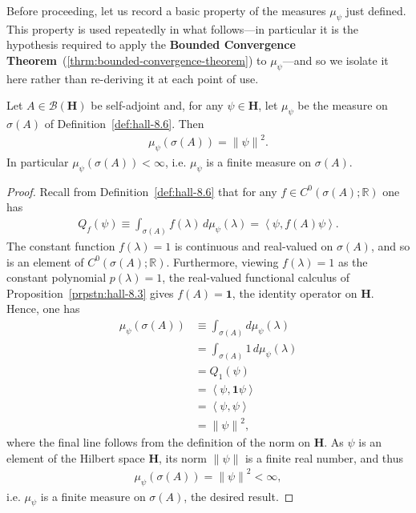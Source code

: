 Before proceeding, let us record a basic property of the measures $\mu_\psi$ just defined. This property is used repeatedly in what follows---in particular it is the hypothesis required to apply the \textbf{Bounded Convergence Theorem}~(\ref{thrm:bounded-convergence-theorem}) to $\mu_\psi$---and so we isolate it here rather than re-deriving it at each point of use.

\begin{lemma}
    \label{lmm:associated-measures-are-finite}
    \leanok
    Let $A \in \mathcal{B}(\mathbf{H})$ be self-adjoint and, for any $\psi \in \mathbf{H}$, let $\mu_\psi$ be the measure on $\sigma(A)$ of Definition~\ref{def:hall-8.6}. Then
    \begin{align}
        \mu_\psi(\sigma(A)) = \left\| \psi \right\|^2.
    \end{align}
    In particular $\mu_\psi(\sigma(A)) < \infty$, i.e. $\mu_\psi$ is a finite measure on $\sigma(A)$.
\end{lemma}
\begin{proof}
    \leanok
Recall from Definition~\ref{def:hall-8.6} that for any $f \in C^0(\sigma(A); \mathbb{R})$ one has
\begin{align}
    Q_f(\psi) \equiv \int_{\sigma(A)} f(\lambda) \, d\mu_\psi(\lambda) = \left< \psi, f(A)\psi \right>.
\end{align}
The constant function $f(\lambda) = 1$ is continuous and real-valued on $\sigma(A)$, and so is an element of $C^0(\sigma(A); \mathbb{R})$. Furthermore, viewing $f(\lambda) = 1$ as the constant polynomial $p(\lambda) = 1$, the real-valued functional calculus of Proposition~\ref{prpstn:hall-8.3} gives $f(A) = \mathbf{1}$, the identity operator on $\mathbf{H}$. Hence, one has
\begin{align}
    \mu_\psi(\sigma(A)) &\equiv \int_{\sigma(A)} d\mu_\psi(\lambda) \\
                        &= \int_{\sigma(A)} 1 \, d\mu_\psi(\lambda) \\
                        &= Q_1(\psi) \\
                        &= \left< \psi, \mathbf{1} \psi \right> \\
                        &= \left< \psi, \psi \right> \\
                        &= \left\| \psi \right\|^2,
\end{align}
where the final line follows from the definition of the norm on $\mathbf{H}$. As $\psi$ is an element of the Hilbert space $\mathbf{H}$, its norm $\left\| \psi \right\|$ is a finite real number, and thus
\begin{align}
    \mu_\psi(\sigma(A)) = \left\| \psi \right\|^2 < \infty,
\end{align}
i.e. $\mu_\psi$ is a finite measure on $\sigma(A)$, the desired result.
\end{proof}

